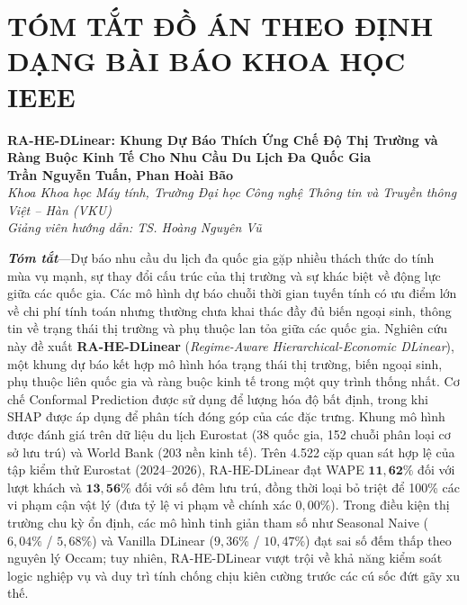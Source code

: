 \chapter*{TÓM TẮT ĐỒ ÁN THEO ĐỊNH DẠNG BÀI BÁO KHOA HỌC IEEE}
\label{ch:summary_ieee}

\begin{center}
  {\fontsize{14pt}{18pt}\selectfont \textbf{RA-HE-DLinear: Khung Dự Báo Thích Ứng Chế Độ Thị Trường và Ràng Buộc Kinh Tế Cho Nhu Cầu Du Lịch Đa Quốc Gia}}\\[10pt]
  {\fontsize{11pt}{14pt}\selectfont \textbf{Trần Nguyễn Tuấn, Phan Hoài Bão}}\\[4pt]
  {\fontsize{10pt}{13pt}\selectfont \textit{Khoa Khoa học Máy tính, Trường Đại học Công nghệ Thông tin và Truyền thông Việt -- Hàn (VKU)}}\\[2pt]
  {\fontsize{10pt}{13pt}\selectfont \textit{Giảng viên hướng dẫn: TS. Hoàng Nguyên Vũ}}\\[15pt]
\end{center}

\noindent \textbf{\textit{Tóm tắt}}---Dự báo nhu cầu du lịch đa quốc gia gặp nhiều thách thức do tính mùa vụ mạnh, sự thay đổi cấu trúc của thị trường và sự khác biệt về động lực giữa các quốc gia. Các mô hình dự báo chuỗi thời gian tuyến tính có ưu điểm lớn về chi phí tính toán nhưng thường chưa khai thác đầy đủ biến ngoại sinh, thông tin về trạng thái thị trường và phụ thuộc lan tỏa giữa các quốc gia. Nghiên cứu này đề xuất \textbf{RA-HE-DLinear} (\textit{Regime-Aware Hierarchical-Economic DLinear}), một khung dự báo kết hợp mô hình hóa trạng thái thị trường, biến ngoại sinh, phụ thuộc liên quốc gia và ràng buộc kinh tế trong một quy trình thống nhất. Cơ chế Conformal Prediction được sử dụng để lượng hóa độ bất định, trong khi SHAP được áp dụng để phân tích đóng góp của các đặc trưng. Khung mô hình được đánh giá trên dữ liệu du lịch Eurostat (38 quốc gia, 152 chuỗi phân loại cơ sở lưu trú) và World Bank (203 nền kinh tế). Trên 4.522 cặp quan sát hợp lệ của tập kiểm thử Eurostat (2024--2026), RA-HE-DLinear đạt WAPE $\mathbf{11{,}62\%}$ đối với lượt khách và $\mathbf{13{,}56\%}$ đối với số đêm lưu trú, đồng thời loại bỏ triệt để 100\% các vi phạm cận vật lý (đưa tỷ lệ vi phạm về chính xác $0{,}00\%$). Trong điều kiện thị trường chu kỳ ổn định, các mô hình tinh giản tham số như Seasonal Naive ($6{,}04\%$ / $5{,}68\%$) và Vanilla DLinear ($9{,}36\%$ / $10{,}47\%$) đạt sai số đếm thấp theo nguyên lý Occam; tuy nhiên, RA-HE-DLinear vượt trội về khả năng kiểm soát logic nghiệp vụ và duy trì tính chống chịu kiên cường trước các cú sốc đứt gãy xu thế.

